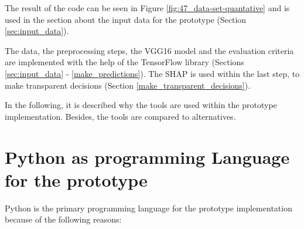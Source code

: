 \nopagebreak
{}

The result of the code can be seen in Figure \ref{fig:47_data-set-quantative} and is used in the section about the input data for the prototype (Section \ref{sec:input_data}).

The data, the preprocessing steps, the VGG16 model and the evaluation criteria are implemented with the help of the TensorFlow library (Sections \ref{sec:input_data} - \ref{make_predictions}). The SHAP is used within the last step, to make transparent decisions (Section \ref{make_transparent_decisions}). 

In the following, it is described why the tools are used within the prototype implementation. Besides, the tools are compared to alternatives. 

\section{Python as programming Language for the prototype}

Python is the primary programming language for the prototype implementation because of the following reasons:

